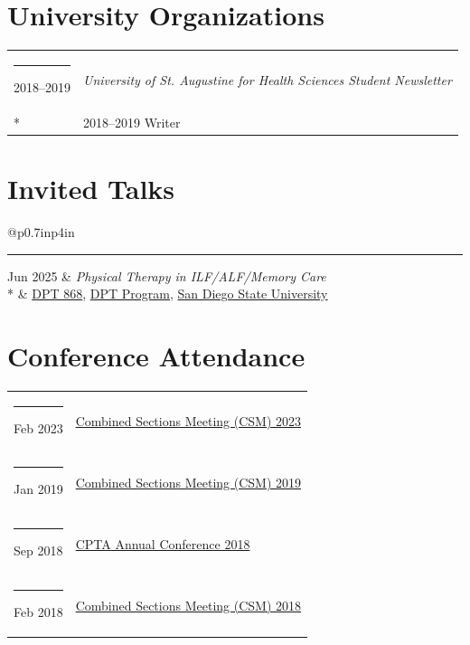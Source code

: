 \documentclass[margin,line]{res}
\begin{document}
\begin{resume}
\section{\sc University Organizations}
\begin{longtable}{@{}p{0.7in}p{4in}}\rule{-1mm}{4.5mm}
\hspace*{-4mm} 2018--2019 & \textit{University of St. Augustine for Health Sciences Student Newsletter}\\*
\hspace*{-4mm} & \hspace{4mm} 2018--2019 Writer\\
\end{longtable}

\section{\sc Invited Talks}
\begin{longtable}{@{}p{0.7in}p{4in}}\rule{-1mm}{4.5mm}
\hspace*{-4mm} Jun 2025 & \textit{Physical Therapy in ILF/ALF/Memory Care}\\*
\hspace*{-4mm} & \hspace{4mm} \href{https://catalog.sdsu.edu/preview_course_nopop.php?catoid=10&coid=75769}{DPT 868}, \href{https://physicaltherapy.sdsu.edu/prospective/curriculum}{DPT Program}, \href{https://www.sdsu.edu/}{San Diego State University}\\
\end{longtable}

\section{\sc Conference Attendance}
\begin{longtable}{@{}p{0.7in}p{4in}}\rule{-1mm}{4.5mm}
\hspace*{-4mm} Feb 2023 & \href{http://www.apta.org/CSM/}{Combined Sections Meeting (CSM) 2023}\\
\hspace*{-4mm} \rule{-1mm}{5mm} Jan 2019 & \href{http://www.apta.org/CSM/}{Combined Sections Meeting (CSM) 2019}\\
\hspace*{-4mm} \rule{-1mm}{5mm} Sep 2018 & \href{https://www.ccapta.org/m/event_details.asp?id=986302}{CPTA Annual Conference 2018}\\
\hspace*{-4mm} \rule{-1mm}{5mm} Feb 2018 & \href{http://www.apta.org/CSM/}{Combined Sections Meeting (CSM) 2018}\\
\end{longtable}


\end{resume}
\end{document}
